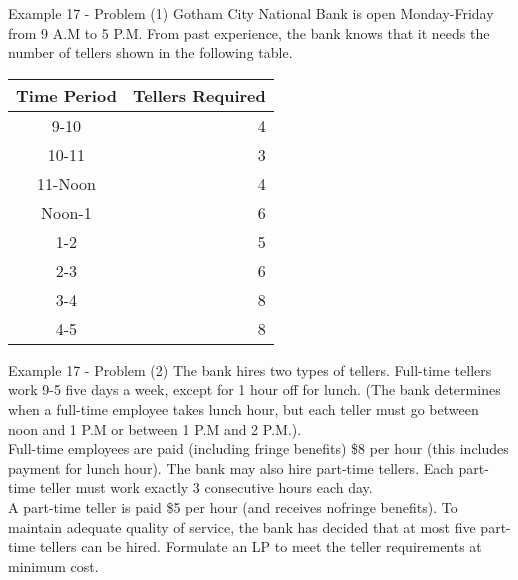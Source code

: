 \begin{frame}{Example 17 - Problem (1)}
Gotham City National Bank is open Monday-Friday from 9 A.M to 5 P.M. From past
experience, the bank knows that it needs the number of tellers shown in the
following table.

\begin{center}
\begin{tabular}{cr}
\hline
  \cellcolor{gray90}\textbf{Time Period}
& \cellcolor{gray90}\textbf{Tellers Required} \\
\hline
9-10    & 4 \\
10-11   & 3 \\
11-Noon & 4 \\
Noon-1  & 6 \\
1-2     & 5 \\
2-3     & 6 \\
3-4     & 8 \\
4-5     & 8 \\
\hline
\end{tabular}
\end{center}

\end{frame}

\begin{frame}{Example 17 - Problem (2)}
The bank hires two types of tellers. Full-time tellers work 9-5 five days a
week, except for 1 hour off for lunch. (The bank determines when a full-time
employee takes lunch hour, but each teller must go between noon and 1 P.M or
between 1 P.M and 2 P.M.). \\
\vspace{3mm}
Full-time employees are paid (including fringe
benefits) \$8 per hour (this includes payment for lunch hour). The bank may
also hire part-time tellers. Each part-time teller must work exactly 3
consecutive hours each day. \\
\vspace{3mm}
A part-time teller is paid \$5 per hour (and receives nofringe benefits). To
maintain adequate quality of service, the bank has decided that at most five
part-time tellers can be hired. Formulate an LP to meet the teller requirements
at minimum cost.
\end{frame}
